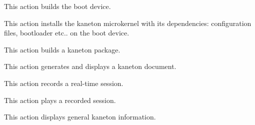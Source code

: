 	{
	  This action builds the boot device.

	}

	{
	  This action installs the kaneton microkernel with its dependencies:
	  configuration files, bootloader etc.. on the boot device.

	}

	{
	  This action builds a kaneton package.


	}

	{
	  This action generates and displays a kaneton document.



	}

	{
	  This action records a real-time session.


	}

	{
	  This action plays a recorded session.



	}

	{
	  This action displays general kaneton information.

	}

